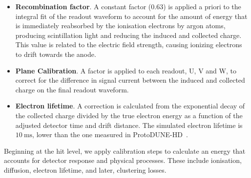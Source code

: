 \begin{itemize}
    \item \textbf{Recombination factor}. A constant factor (0.63) is applied a priori to the integral fit of the readout waveform to account for the amount of energy that is immediately reabsorbed by the ionisation electrons by argon atoms, producing scintillation light and reducing the induced and collected charge. This value is related to the electric field strength, causing ionizing electrons to drift towards the anode.%
    \item \textbf{Plane Calibration}. A factor is applied to each readout, U, V and W, to correct for the difference in signal current between the induced and collected charge on the final readout waveform.
    \item \textbf{Electron lifetime}. A correction is calculated from the exponential decay of the collected charge divided by the true electron energy as a function of the adjusted detector time and drift distance. The simulated electron lifetime is $\SI{10}{\milli\second}$, lower than the one measured in ProtoDUNE-HD~\cite{DUNE:2020cqd}.%
\end{itemize}

Beginning at the hit level, we apply calibration steps to calculate an energy that accounts for detector response and physical processes. These include ionisation, diffusion, electron lifetime, and later, clustering losses.